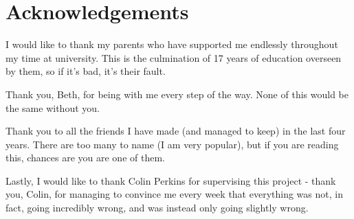 \chapter*{Acknowledgements}

I would like to thank my parents who have supported me endlessly throughout my time at university. This is the culmination of 17 years of education overseen by them, so if it's bad, it's their fault. 

Thank you, Beth, for being with me every step of the way. None of this would be the same without you.

Thank you to all the friends I have made (and managed to keep) in the last four years. There are too many to name (I am very popular), but if you are reading this, chances are you are one of them. 

Lastly, I would like to thank Colin Perkins for supervising this project - thank you, Colin, for managing to convince me every week that everything was not, in fact, going incredibly wrong, and was instead only going slightly wrong. 


%
%
\def\consentname {Alex Paterson} %
\def\consentdate {10th February 2022} %
%
\educationalconsent


\tableofcontents

%
%
%

